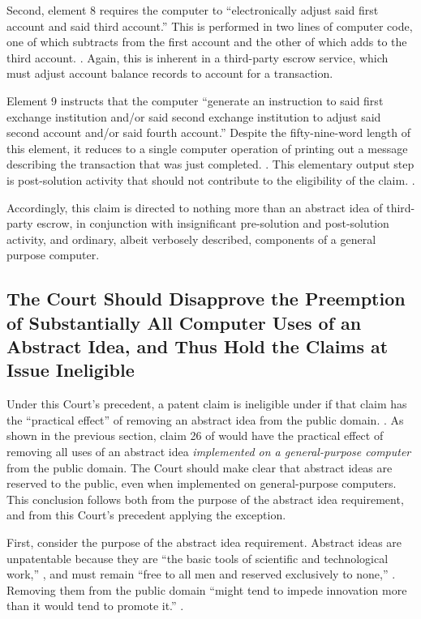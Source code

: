 \documentclass{scotus}
\begin{document}
Second, element 8 requires the computer to ``electronically adjust said first
account and said third account.'' This is performed in two lines of computer
code, one of which subtracts from the first account and the other of which adds
to the third account. . Again, this
is inherent in a third-party escrow service, which must adjust account balance
records to account for a transaction.

Element 9 instructs that the computer ``generate an instruction to said first
exchange institution and/or said second exchange institution to adjust said
second account and/or said fourth account.'' Despite the fifty-nine-word length
of this element, it reduces to a single computer operation of printing out a
message describing the transaction that was just completed. . This elementary output step is post-solution activity
that should not contribute to the eligibility of the claim. .

Accordingly, this claim is directed to nothing more than an abstract idea of
third-party escrow, in conjunction with insignificant pre-solution and
post-solution activity, and ordinary, albeit verbosely described, components of
a general purpose computer.

\subsection{The Court Should Disapprove the Preemption of Substantially All
Computer Uses of an Abstract Idea, and Thus Hold the Claims at Issue Ineligible}

Under this Court's precedent, a patent claim is ineligible under  if
that claim has the “practical effect” of removing an abstract idea from the
public domain.  .  As shown in the previous
section, claim 26 of  would have the practical effect of removing
all uses of an abstract idea \emph{implemented on a general-purpose computer}
from the public domain. The Court should make clear that abstract ideas are
reserved to the public, even when implemented on general-purpose computers.
This conclusion follows both from the purpose of the abstract idea requirement,
and from this Court’s precedent applying the exception.

First, consider the purpose of the abstract idea requirement.  Abstract ideas
are unpatentable because they are “the basic tools of scientific and
technological work,” , and must remain “free to all
men and reserved exclusively to none,” .  Removing them from the public domain “might tend
to impede innovation more than it would tend to promote it.”  .
\end{document}
